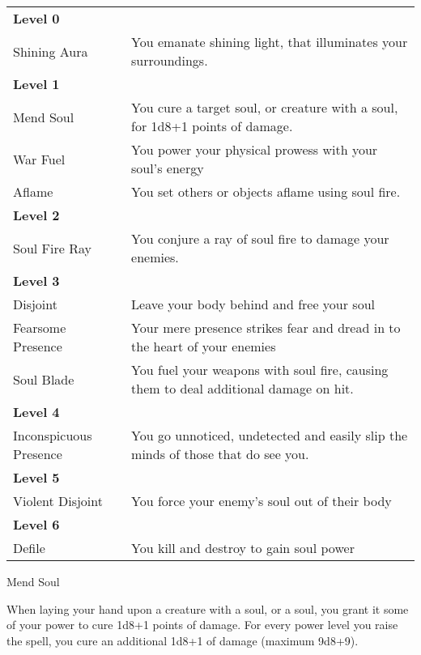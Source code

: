 \begin{table*}[!htb]
  \caption{Soul Powers}
  \begin{tabular}{p{4cm} p{11cm}}
    \textbf{Level 0} & \nobreak \\
    Shining Aura     & You emanate shining light, that illuminates your surroundings. \\
    \textbf{Level 1} & \nobreak \\
    Mend Soul        & You cure a target soul, or creature with a soul, for 1d8+1 points of damage. \\
    War Fuel         & You power your physical prowess with your soul's energy \\
    Aflame           & You set others or objects aflame using soul fire. \\
    \textbf{Level 2} & \nobreak \\
    Soul Fire Ray    & You conjure a ray of soul fire to damage your enemies. \\
    \textbf{Level 3} & \nobreak \\
    Disjoint         & Leave your body behind and free your soul \\
    Fearsome Presence& Your mere presence strikes fear and dread in to the heart of your enemies \\
    Soul Blade       & You fuel your weapons with soul fire, causing them to deal additional damage on hit. \\
    \textbf{Level 4} & \nobreak \\
    Inconspicuous Presence & You go unnoticed, undetected and easily slip the minds of those that do see you. \\
    \textbf{Level 5} & \nobreak \\
    Violent Disjoint & You force your enemy's soul out of their body \\
    \textbf{Level 6} & \nobreak \\
    Defile           & You kill and destroy to gain soul power \\
  \end{tabular}
\end{table*}

\begin{soulpower}{Mend Soul}
  \rangetouch
  \instantaneous

  When laying your hand upon a creature with a soul, or a soul, you grant it
  some of your power to cure 1d8+1 points of damage. For every power level you
  raise the spell, you cure an additional 1d8+1 of damage (maximum 9d8+9).
\end{soulpower}

